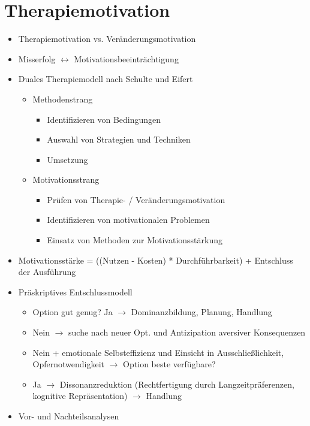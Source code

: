 \documentclass[11pt, paper=a4, twocolumn]{scrartcl}
\begin{document}
	\section{Therapiemotivation}
		\begin{itemize}
			\item Therapiemotivation vs. Veränderungsmotivation
			\item Misserfolg $\leftrightarrow$ Motivationsbeeinträchtigung
			\item Duales Therapiemodell nach Schulte und Eifert
				\begin{itemize}
					\item Methodenstrang
						\begin{itemize}
							\item Identifizieren von Bedingungen
							\item Auswahl von Strategien und Techniken
							\item Umsetzung
						\end{itemize}
					\item Motivationsstrang
						\begin{itemize}
							\item Prüfen von Therapie- / Veränderungsmotivation
							\item Identifizieren von motivationalen Problemen
							\item Einsatz von Methoden zur Motivationsstärkung
						\end{itemize}
				\end{itemize}
			\item Motivationsstärke = ((Nutzen - Kosten) * Durchführbarkeit) + Entschluss der Ausführung
			\item Präskriptives Entschlussmodell
				\begin{itemize}
					\item Option gut genug? Ja $\rightarrow$ Dominanzbildung, Planung, Handlung
					\item Nein $\rightarrow$ suche nach neuer Opt. und Antizipation aversiver Konsequenzen
					\item Nein + emotionale Selbsteffizienz und Einsicht in Ausschließlichkeit, Opfernotwendigkeit 
						$\rightarrow$ Option beste verfügbare?
					\item Ja $\rightarrow$ Dissonanzreduktion (Rechtfertigung durch Langzeitpräferenzen, kognitive Repräsentation) 
						$\rightarrow$ Handlung
				\end{itemize}
			\item Vor- und Nachteilsanalysen

\end{itemize}
\end{document}
